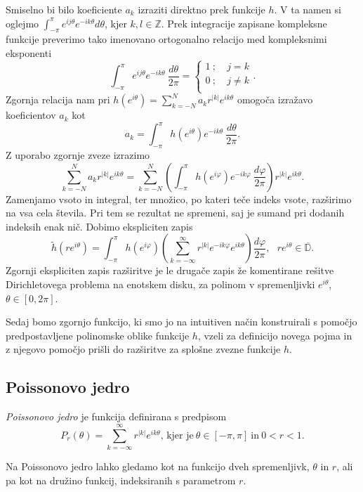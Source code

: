 \documentclass[mat1, tisk]{fmfdelo}
\begin{document}
    Smiselno bi bilo koeficiente $a_k$ izraziti direktno prek funkcije $h$. 
    V ta namen si oglejmo $\int_{-\pi}^{\pi}{e^{ij\theta} e^{-ik\theta}d\theta}$, kjer $k,l \in \mathbb{Z}$. Prek integracije zapisane kompleksne funkcije preverimo tako imenovano ortogonalno relacijo med kompleksnimi eksponenti
        $$
        \int_{-\pi}^{\pi}{e^{ij\theta} e^{-ik\theta}~\frac{d\theta}{2\pi}} = 
        \begin{cases}
            1~;~&j=k\\
            0~;~&j \neq k\\
        \end{cases}
        .$$
    Zgornja relacija nam pri $h(e^{i\theta}) = \sum_{k = -N}^{N}{a_k r^{|k|} e^{ik\theta}}$ omogoča izražavo koeficientov $a_k$ kot
        $$
            a_ k = \int_{-\pi}^{\pi}{h \left(e^{i\theta}\right)e^{-ik\theta}~\frac{d\theta}{2\pi}}.
        $$
    Z uporabo zgornje zveze izrazimo
    $$
        \sum_{k = - N}^{N}{ a_k r^{|k|}e^{ik\theta}} = \sum_{k = - N}^{N} \left(\int_{-\pi}^{\pi}{h(e^{i \varphi}) e^{- i k \varphi}~\frac{d \varphi}{2 \pi}}\right) r^{|k|} e^{i k \theta}.
    $$
    Zamenjamo vsoto in integral, ter množico, po kateri teče indeks vsote, razširimo na vsa cela števila. Pri tem se rezultat ne spremeni, saj je sumand pri dodanih indeksih enak nič. Dobimo ekspliciten zapis
    \begin{equation}
        \label{int1}
        \widetilde{h}(r e^{i \theta}) = \int_{-\pi}^{\pi}{h(e^{i \varphi}) \left(\sum_{k = - \infty}^{\infty} r^{|k|} e^{- i k \varphi} e^{i k \theta} \right) \frac{d \varphi}{2 \pi}}, ~~~ r e^{i\theta} \in \overline{\mathbb{D}}.
    \end{equation}
    Zgornji ekspliciten zapis razširitve je le drugače zapis že komentirane rešitve Dirichletovega problema na enotskem disku, za polinom v spremenljivki $e^{i \theta}$, \mbox{$\theta \in [0,2\pi]$}.
    
    Sedaj bomo zgornjo funkcijo, ki smo jo na intuitiven način konstruirali s pomočjo predpostavljene polinomske oblike funkcije $h$, vzeli za definicijo novega pojma in z njegovo pomočjo prišli do razširitve za splošne zvezne funkcije $h$.
    
\subsection{Poissonovo jedro}
    \begin{definicija}
        \emph{Poissonovo jedro} je funkcija definirana s predpisom
        $$
           P_r(\theta) = \sum_{k = -\infty}^{\infty}{r^{|k|} e^{i k \theta}}\text{, kjer je}~\theta \in [-\pi, \pi]~\text{in}~ 0 < r < 1.
        $$
    \end{definicija}
    \begin{opomba}
        Na Poissonovo jedro lahko gledamo kot na funkcijo dveh spremenljivk, $\theta$ in $r$, ali pa kot na družino funkcij, indeksiranih s parametrom $r$.
    \end{opomba}
\end{document}
